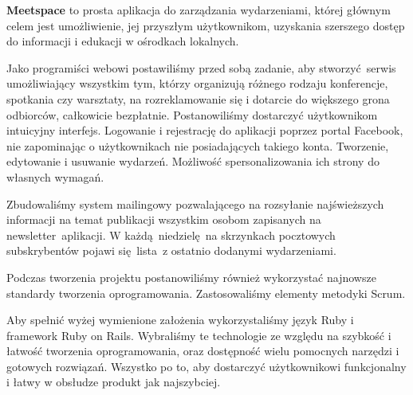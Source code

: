 \textbf{Meetspace} to prosta aplikacja do zarządzania wydarzeniami, której głównym celem jest umożliwienie, jej przyszłym użytkownikom, uzyskania szerszego dostęp do informacji i edukacji w ośrodkach lokalnych.


Jako programiści webowi postawiliśmy przed sobą zadanie, aby stworzyć serwis umożliwiający wszystkim tym, którzy organizują różnego rodzaju konferencje, spotkania czy warsztaty, na rozreklamowanie się i dotarcie do większego grona odbiorców, całkowicie bezpłatnie.
Postanowiliśmy dostarczyć użytkownikom intuicyjny interfejs.
Logowanie i rejestrację do aplikacji poprzez portal Facebook, nie zapominając o użytkownikach nie posiadających takiego konta. Tworzenie, edytowanie i usuwanie wydarzeń.
Możliwość spersonalizowania ich strony do własnych wymagań.


Zbudowaliśmy system mailingowy pozwalającego na rozsyłanie najświeższych informacji na temat publikacji wszystkim osobom zapisanych na newsletter aplikacji.
W każdą niedzielę na skrzynkach pocztowych subskrybentów pojawi się lista z ostatnio dodanymi wydarzeniami.

Podczas tworzenia projektu postanowiliśmy również wykorzystać najnowsze standardy tworzenia oprogramowania.
Zastosowaliśmy elementy metodyki Scrum.

Aby spełnić wyżej wymienione założenia wykorzystaliśmy język Ruby i framework Ruby on Rails.
Wybraliśmy te technologie ze względu na szybkość i łatwość tworzenia oprogramowania, oraz dostępność wielu pomocnych narzędzi i gotowych rozwiązań.
Wszystko po to, aby dostarczyć użytkownikowi funkcjonalny i łatwy w obsłudze produkt jak najszybciej.
